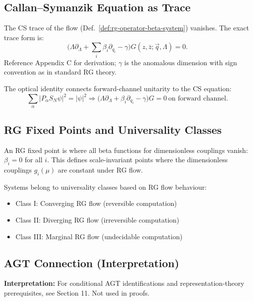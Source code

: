 \subsection{Callan–Symanzik Equation as Trace}

The CS trace of the flow (Def.~\ref{def:rg-operator-beta-system}) vanishes. The exact trace form is:
\[
\Big(\Lambda\partial_\Lambda + \sum_i \beta_i\partial_{q_i} - \gamma\Big) G(z,\bar z;\vec q,\Lambda)=0.
\]
Reference Appendix C for derivation; $\gamma$ is the anomalous dimension with sign convention as in standard RG theory.

\begin{notation}
\label{not:optical-identity}
The optical identity connects forward-channel unitarity to the CS equation:
\[
\sum_\alpha|P_\alpha S_N\psi|^2=|\psi|^2 \Longrightarrow \big(\Lambda\partial_\Lambda+\beta_i\partial_{q_i}-\gamma\big)G=0\ \text{on forward channel.}
\]
\end{notation}

\subsection{RG Fixed Points and Universality Classes}

\begin{definition}
\label{def:rg-fixed-points}
An RG fixed point is where all beta functions for dimensionless couplings vanish: $\beta_i = 0$ for all $i$. This defines scale-invariant points where the dimensionless couplings $g_i(\mu)$ are constant under RG flow.
\end{definition}

\begin{definition}
\label{def:computational-universality}
Systems belong to universality classes based on RG flow behaviour:
\begin{itemize}
\item Class I: Converging RG flow (reversible computation)
\item Class II: Diverging RG flow (irreversible computation)  
\item Class III: Marginal RG flow (undecidable computation)
\end{itemize}
\end{definition}

\subsection{AGT Connection (Interpretation)}
\begin{remark}
\textbf{Interpretation:} For conditional AGT identifications and representation-theory prerequisites, see Section 11. Not used in proofs.
\end{remark}


